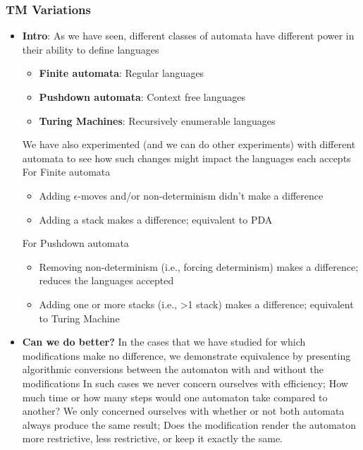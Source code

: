 \documentclass{report}
\begin{document}
    \pagebreak 
    \subsubsection{TM Variations}
    \begin{itemize}
        \item \textbf{Intro}: As we have seen, different classes of automata have different power in their ability to define languages
            \begin{itemize}
                \item \textbf{Finite automata}: Regular languages
                \item \textbf{Pushdown automata}: Context free languages
                \item  \textbf{Turing Machines}: Recursively enumerable languages
            \end{itemize}
            \bigbreak \noindent 
            We have also experimented (and we can do other experiments) with different automata to see how such changes might impact the languages each accepts
            \bigbreak \noindent 
            For Finite automata
            \begin{itemize}
                \item Adding $\epsilon$-moves and/or non-determinism didn’t make a difference
                \item Adding a stack makes a difference; equivalent to PDA
            \end{itemize}
            \bigbreak \noindent 
            For Pushdown automata
            \begin{itemize}
                \item Removing non-determinism (i.e., forcing determinism) makes a difference; reduces the languages accepted
                \item Adding one or more stacks (i.e., >1 stack) makes a difference; equivalent to Turing Machine
            \end{itemize}
        \item \textbf{Can we do better?} In the cases that we have studied for which modifications make no difference, we demonstrate equivalence by presenting algorithmic conversions between the automaton with and without the modifications
            \bigbreak \noindent 
            In such cases we never concern ourselves with efficiency; How much time or how many steps would one automaton take compared to another?
            \bigbreak \noindent 
            We only concerned ourselves with whether or not both automata always produce the same result; Does the modification render the automaton more restrictive, less restrictive, or keep it exactly the same.

\end{itemize}
\end{document}
